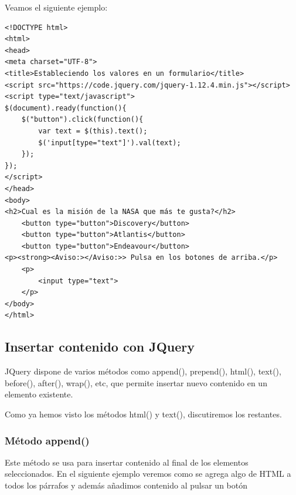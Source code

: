 \documentclass[a4paper, oneside]{article}
\begin{document}
\begin{enumerate}
Veamos el siguiente ejemplo:

\begin{verbatim}
<!DOCTYPE html>
<html>
<head>
<meta charset="UTF-8">
<title>Estableciendo los valores en un formulario</title>
<script src="https://code.jquery.com/jquery-1.12.4.min.js"></script>
<script type="text/javascript">
$(document).ready(function(){
    $("button").click(function(){
        var text = $(this).text();
        $('input[type="text"]').val(text);
    });
});
</script>
</head>
<body>
<h2>Cual es la misión de la NASA que más te gusta?</h2>
    <button type="button">Discovery</button>
    <button type="button">Atlantis</button>
    <button type="button">Endeavour</button>
<p><strong><Aviso:></Aviso:>> Pulsa en los botones de arriba.</p>
    <p>
        <input type="text">
    </p>
</body>
</html>                                		
\end{verbatim}
\end{enumerate}

\subsection{Insertar contenido con JQuery}
\label{sec:org2f7c0ac}

JQuery dispone de varios métodos como append(), prepend(), html(), text(), before(), after(), wrap(), etc, que permite insertar nuevo contenido en un elemento existente.

Como ya hemos visto los métodos html() y text(), discutiremos los restantes.

\subsubsection{Método append()}
\label{sec:org2145d37}

Este método se usa para insertar contenido al final de los elementos seleccionados. En el siguiente ejemplo veremos como se agrega algo de HTML a todos los párrafos y además añadimos contenido al pulsar un botón
\end{document}
